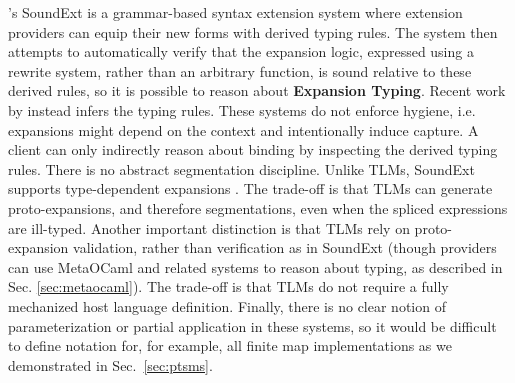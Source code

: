 \documentclass[acmsmall,screen]{acmart}
\begin{document}
\citet{conf/icfp/LorenzenE13,conf/popl/LorenzenE16}'s SoundExt is a grammar-based syntax extension system where extension providers can equip their new forms with derived typing rules. The system then attempts to automatically verify that the expansion logic, expressed using a rewrite system, rather than an arbitrary function, is sound relative to these derived rules, so it is possible to reason about \textbf{Expansion Typing}. Recent work by \citet{DBLP:conf/pldi/PombrioK18} instead infers the typing rules. These systems do not enforce hygiene, i.e. expansions might depend on the context and intentionally induce capture. A client can only indirectly reason about binding by inspecting the derived typing rules. There is no abstract segmentation discipline. Unlike TLMs, SoundExt supports type-dependent expansions \cite{conf/popl/LorenzenE16}. The trade-off is that TLMs can generate proto-expansions, and therefore segmentations, even when the spliced expressions are ill-typed. Another important distinction is that TLMs rely on proto-expansion validation, rather than verification as in SoundExt (though providers can use MetaOCaml and related systems to reason about typing, as described in Sec. \ref{sec:metaocaml}). The trade-off is that TLMs do not require a fully mechanized host language definition. Finally, there is no clear notion of parameterization or partial application in these systems, so it would be difficult to define notation for, for example, all finite map implementations as we demonstrated in Sec.~\ref{sec:ptsms}.



\end{document}
